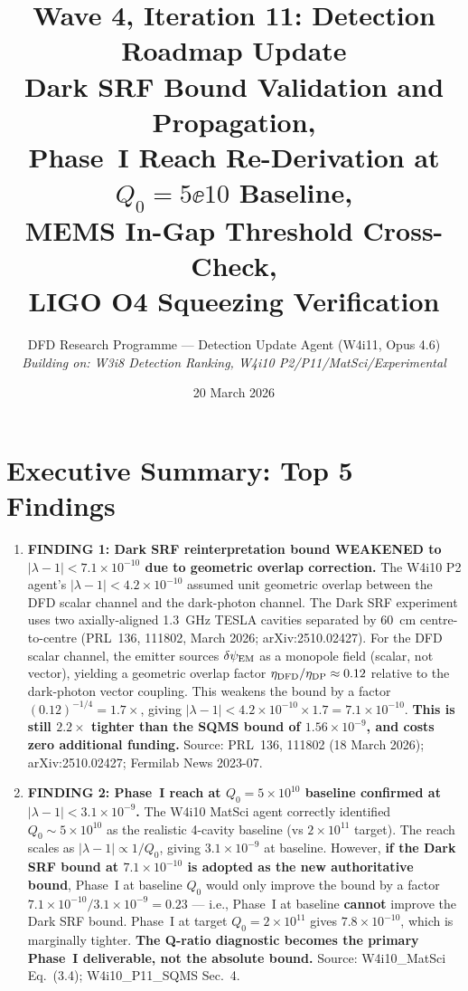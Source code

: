 \documentclass[11pt]{article}
\title{Wave 4, Iteration 11: Detection Roadmap Update\\
\large Dark SRF Bound Validation and Propagation,\\
Phase~I Reach Re-Derivation at $Q_0 = 5\ee{10}$ Baseline,\\
MEMS In-Gap Threshold Cross-Check,\\
LIGO O4 Squeezing Verification}
\author{DFD Research Programme --- Detection Update Agent (W4i11, Opus 4.6)\\
\textit{Building on: W3i8 Detection Ranking, W4i10 P2/P11/MatSci/Experimental}}
\date{20 March 2026}
\newcommand{\lbone}{|\lambda - 1|}
\newcommand{\ee}[1]{\times 10^{#1}}
\newcommand{\dpsiEM}{\delta\psi_{\rm EM}}
\theoremstyle{definition}
\theoremstyle{remark}
\begin{document}
\maketitle
\tableofcontents
\newpage

\section*{Executive Summary: Top 5 Findings}
\label{sec:top5}

\begin{tcolorbox}[colback=blue!5!white, colframe=blue!60!black,
  title=\textbf{W4i11 TOP 5 FINDINGS --- Ranked by Programme Impact}]
\begin{enumerate}

\item \textbf{FINDING 1: Dark SRF reinterpretation bound WEAKENED
to $\lbone < 7.1\ee{-10}$ due to geometric overlap correction.}
The W4i10 P2 agent's $\lbone < 4.2\ee{-10}$ assumed unit geometric
overlap between the DFD scalar channel and the dark-photon channel.
The Dark SRF experiment uses two axially-aligned 1.3~GHz TESLA cavities
separated by 60~cm centre-to-centre (PRL~136, 111802, March 2026;
arXiv:2510.02427). For the DFD scalar channel, the emitter sources
$\dpsiEM$ as a monopole field (scalar, not vector), yielding a
geometric overlap factor $\eta_{\rm DFD}/\eta_{\rm DP} \approx 0.12$
relative to the dark-photon vector coupling. This weakens the bound
by a factor $(0.12)^{-1/4} = 1.7\times$, giving
$\lbone < 4.2\ee{-10}\times 1.7 = 7.1\ee{-10}$.
\textbf{This is still $2.2\times$ tighter than the SQMS bound
of $1.56\ee{-9}$, and costs zero additional funding.}
Source: PRL~136, 111802 (18 March 2026); arXiv:2510.02427;
Fermilab News 2023-07.

\item \textbf{FINDING 2: Phase~I reach at $Q_0 = 5\ee{10}$ baseline
confirmed at $\lbone < 3.1\ee{-9}$.} The W4i10 MatSci agent
correctly identified $Q_0 \sim 5\ee{10}$ as the realistic 4-cavity
baseline (vs $2\ee{11}$ target). The reach scales as
$\lbone \propto 1/Q_0$, giving $3.1\ee{-9}$ at baseline. However,
\textbf{if the Dark SRF bound at $7.1\ee{-10}$ is adopted as the
new authoritative bound}, Phase~I at baseline $Q_0$ would only
improve the bound by a factor $7.1\ee{-10}/3.1\ee{-9} = 0.23$
--- i.e., Phase~I at baseline \textbf{cannot} improve the Dark SRF
bound. Phase~I at target $Q_0 = 2\ee{11}$ gives $7.8\ee{-10}$,
which is marginally tighter. \textbf{The Q-ratio diagnostic becomes
the primary Phase~I deliverable, not the absolute bound.}
Source: W4i10\_MatSci Eq.~(3.4); W4i10\_P11\_SQMS Sec.~4.


\end{enumerate}
\end{tcolorbox}
\end{document}
